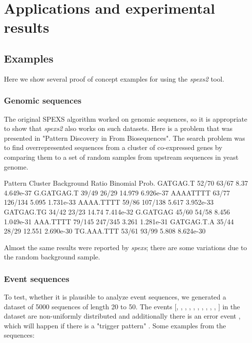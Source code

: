 \chapter{Applications and experimental results}
\label{c:results}

\section{Examples}

Here we show several proof of concept examples for using the \emph{spexs2} tool.

\subsection{Genomic sequences}

The original SPEXS algorithm worked on genomic sequences, so it is appropriate to show that \emph{spexs2} also works on such datasets. Here is a problem that was presented in "Pattern Discovery in From Biosequences"\cite{spexs}. The search problem was to find overrepresented sequences from a cluster of co-expressed genes by comparing them to a set of random samples from upstream sequences in yeast genome.

\begin{file}
Pattern       Cluster    Background   Ratio      Binomial Prob.
GATGAG.T      52/70      63/67        8.37       4.649e-37
G.GATGAG.T    39/49      26/29        14.979     6.926e-37
AAAATTTT      63/77      126/134      5.095      1.731e-33
AAAA.TTTT     59/86      107/138      5.617      3.952e-33
GATGAG.TG     34/42      23/23        14.74      7.414e-32
G.GATGAG      45/60      54/58        8.456      1.049e-31
AAA.TTTT      79/145     247/345      3.261      1.281e-31
GATGAG.T.A    35/44      28/29        12.551     2.690e-30
TG.AAA.TTT    53/61      93/99        5.808      8.624e-30
\end{file}

Almost the same results were reported by \emph{spexs}; there are some variations due to the random background sample.

\subsection{Event sequences}

To test, whether it is plausible to analyze event sequences, we generated a dataset of 5000 sequences of length 20 to 50. The events [, , , , , , , , , , ] in the dataset are non-uniformly distributed and additionally there is an error event , which will happen if there is a "trigger pattern" . Some examples from the sequences:


